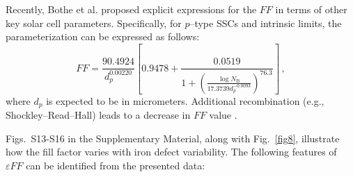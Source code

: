 \documentclass[a4paper,fleqn]{cas-sc}
\begin{document}
Recently, Bothe et al. \cite{Bothe2023} proposed explicit expressions for the $FF$ in terms of other key solar cell parameters.
Specifically, for $p$--type SSCs and intrinsic limits, the parameterization can be expressed as follows:
\begin{equation}
\label{eqFF3}
    FF = \frac{90.4924}{d_p^{0.00220}}\left[0.9478+\frac{0.0519}{1+\left(\frac{\log N_\mathrm{B}}{17.3739 d_p^{-0.0093}}\right)^{76.3}}\right] \,,
\end{equation}
where
$d_p$ is expected to be in micrometers.
Additional recombination (e.g., Shockley–Read–Hall) leads to a decrease in $FF$ value \cite{Bothe2023}.

Figs.~S13-S16 in the Supplementary Material, along with Fig.~\ref{fig8}, illustrate how the fill factor varies with iron defect variability.
The following features of $\varepsilon FF$ can be identified from the presented data:
\end{document}
